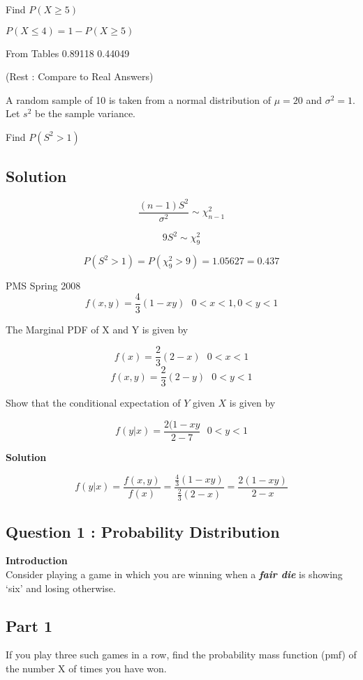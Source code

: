 \documentclass[]{report}
\begin{document}
Find $P(X\geq 5)$ 

$ P(X\leq 4)  = 1 - P(X\geq 5) $

From Tables 
0.89118
0.44049

(Rest : Compare to Real Answers)


A random sample of 10 is taken from a normal distribution of $\mu=20$ and $\sigma^2=1$. Let $s^2$ be the sample variance.

Find $P(S^2>1)$

\subsection*{Solution}

\[ \frac{(n-1)S^2}{\sigma^2} \sim \chi^2_{n-1}\]

\[ 9S^2 \sim \chi^2_{9}\]


\[ P(S^2>1) = P(\chi^2_{9}>9) = 1.05627 = 0.437\]


PMS Spring 2008 
\[f(x,y) = \frac{4}{3}(1-xy) \mbox{   }0<x<1,0<y<1  \]

The Marginal PDF of X and Y is given by 

\[f(x) = \frac{2}{3}(2-x) \mbox{   }0<x<1 \]
\[f(x,y) = \frac{2}{3}(2-y) \mbox{   }0<y<1  \]

Show that the conditional expectation of $Y$ given $X$ is given by

\[ f(y|x) = \frac{2(1-xy}{2-7} \mbox{   }0<y<1\]

\textbf{Solution}

\[ f(y|x) = \frac{f(x,y)}{f(x)} = \frac{\frac{4}{3}(1-xy)}{\frac{2}{3}(2-x)} = \frac{2(1-xy)}{2-x}\]





\subsection{Question 1 : Probability Distribution}

\noindent \textbf{Introduction}\\

Consider playing a game in which you are winning when a \textbf{\emph{fair die}} is showing `six'
and losing otherwise.

\subsection{Part 1}If you play three such games in a row, find the probability mass function (pmf) of the number
X of times you have won.
\end{document}
